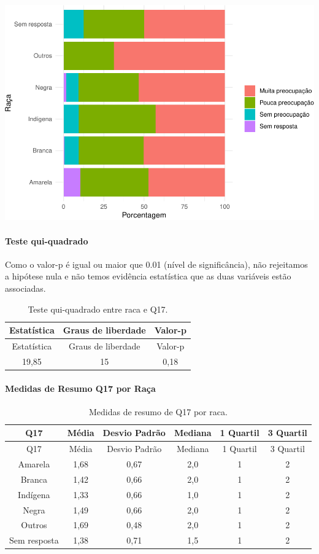 \documentclass[]{article}
\let\oldparagraph\paragraph
\renewcommand{\paragraph}[1]{\oldparagraph{#1}\mbox{}}
\begin{document}
\begin{center}\includegraphics[width=0.75\linewidth]{relatorio_covid19_files/figure-latex/unnamed-chunk-220-1} \end{center}

\hypertarget{teste-qui-quadrado-20}{%
\paragraph{Teste qui-quadrado}\label{teste-qui-quadrado-20}}

Como o valor-p é igual ou maior que 0.01 (nível de significância), não rejeitamos a hipótese nula e não temos evidência estatística que as duas variáveis estão associadas.

\begin{longtable}[]{@{}ccc@{}}
\caption{\label{tab:unnamed-chunk-222}Teste qui-quadrado entre raca e Q17.}\tabularnewline
\toprule
Estatística & Graus de liberdade & Valor-p\tabularnewline
\midrule
\endfirsthead
\toprule
Estatística & Graus de liberdade & Valor-p\tabularnewline
\midrule
\endhead
19,85 & 15 & 0,18\tabularnewline
\bottomrule
\end{longtable}

\cleardoublepage

\hypertarget{medidas-de-resumo-q17-por-rauxe7a}{%
\paragraph{Medidas de Resumo Q17 por Raça}\label{medidas-de-resumo-q17-por-rauxe7a}}

\begin{longtable}[]{@{}cccccc@{}}
\caption{\label{tab:unnamed-chunk-223}Medidas de resumo de Q17 por raca.}\tabularnewline
\toprule
Q17 & Média & Desvio Padrão & Mediana & 1 Quartil & 3 Quartil\tabularnewline
\midrule
\endfirsthead
\toprule
Q17 & Média & Desvio Padrão & Mediana & 1 Quartil & 3 Quartil\tabularnewline
\midrule
\endhead
Amarela & 1,68 & 0,67 & 2,0 & 1 & 2\tabularnewline
Branca & 1,42 & 0,66 & 2,0 & 1 & 2\tabularnewline
Indígena & 1,33 & 0,66 & 1,0 & 1 & 2\tabularnewline
Negra & 1,49 & 0,66 & 2,0 & 1 & 2\tabularnewline
Outros & 1,69 & 0,48 & 2,0 & 1 & 2\tabularnewline
Sem resposta & 1,38 & 0,71 & 1,5 & 1 & 2\tabularnewline
\bottomrule
\end{longtable}
\end{document}
